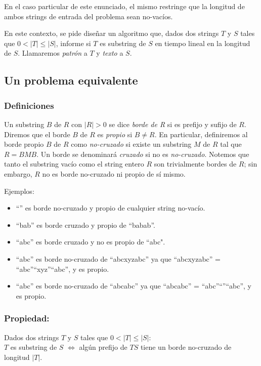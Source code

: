 En el caso particular de este enunciado, el mismo restringe que la longitud de ambos strings de entrada del problema sean no-vacíos.

En este contexto, se pide diseñar un algoritmo que, dados dos strings $T$ y $S$ tales que $0 < |T| \leq |S|$, informe si $T$ es substring de $S$ en tiempo lineal en la longitud de $S$. Llamaremos \textit{patrón} a $T$ y \textit{texto} a $S$.

\subsection{Un problema equivalente}

\subsubsection{Definiciones}

Un substring $B$ de $R$ con $|R| > 0$ se dice \textit{borde de R} si es prefijo y sufijo de $R$. Diremos que el borde $B$ de $R$ es \textit{propio} si $B \neq R$. En particular, definiremos al borde propio $B$ de $R$ como \textit{no-cruzado} si existe un substring $M$ de $R$ tal que $R = BMB$. Un borde se denominará \textit{cruzado} si no es \textit{no-cruzado}. Notemos que tanto el substring vacío como el string entero $R$ son trivialmente bordes de $R$; sin embargo, $R$ no es borde no-cruzado ni propio de sí mismo.

Ejemplos:
\begin{itemize}
\item ``'' es borde no-cruzado y propio de cualquier string no-vacío.
\item ``bab'' es borde cruzado y propio de ``babab''.
\item ``abc'' es borde cruzado y no es propio de ``abc".
\item ``abc'' es borde no-cruzado de ``abcxyzabc'' ya que ``abcxyzabc'' = ``abc''``xyz''``abc'', y es propio.
\item ``abc'' es borde no-cruzado de ``abcabc'' ya que ``abcabc'' = ``abc''``''``abc'', y es propio.
\end{itemize}

\subsubsection{Propiedad:} Dados dos strings $T$ y $S$ tales que $0 < |T| \leq |S|$: \\
$T$ es substring de $S$ $\iff$ algún prefijo de $TS$ tiene un borde no-cruzado de longitud $|T|$.

